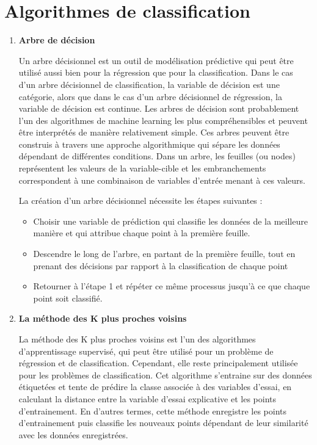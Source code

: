 \documentclass[12pt,a4paper,openay]{book}
\numberwithin{equation}{chapter}
\begin{document}
	\section{Algorithmes de classification}
	  \begin{enumerate}
	  
	  \item \textbf{Arbre de d\'ecision}
	  
	  Un arbre d\'ecisionnel est un outil de mod\'elisation pr\'edictive qui peut \^etre utilis\'e aussi bien pour la r\'egression que pour la classification. Dans le cas d'un arbre d\'ecisionnel de classification, la variable de d\'ecision est une cat\'egorie, alors que dans le cas d'un arbre d\'ecisionnel de r\'egression, la variable de d\'ecision est continue. Les arbres de d\'ecision sont probablement l'un des algorithmes de machine learning les plus compr\'ehensibles et peuvent \^etre interpr\'et\'es de mani\`ere relativement simple. Ces arbres peuvent \^etre construis \`a travers une approche algorithmique qui s\'epare les donn\'ees d\'ependant de diff\'erentes conditions. Dans un arbre, les feuilles (ou nodes) repr\'esentent les valeurs de la variable-cible et les embranchements correspondent \`a une combinaison de variables d'entr\'ee menant \`a ces valeurs.
	  
	  La cr\'eation d'un arbre d\'ecisionnel n\'ecessite les \'etapes suivantes :	  
	  \begin{itemize}
        \item Choisir une variable de pr\'ediction qui classifie les donn\'ees de la meilleure mani\`ere et qui attribue chaque point \`a la premi\`ere feuille.
	  	  
	  	  \item Descendre le long de l'arbre, en partant de la premi\`ere feuille, tout en prenant des d\'ecisions par rapport \`a la classification de chaque point
	  	  
	  	  \item Retourner \`a l'\'etape 1 et r\'ep\'eter ce m\^eme processus jusqu'\`a ce que chaque point soit classifi\'e.
	  \end{itemize}
	  \item \textbf{La m\'ethode des K plus proches voisins}
	  
	  La m\'ethode des K plus proches voisins est l'un des algorithmes d'apprentissage supervis\'e, qui peut \^etre utilis\'e pour un probl\`eme de r\'egression et de classification. Cependant, elle reste principalement utilis\'ee pour les probl\`emes de classification. Cet algorithme s'entraine sur des donn\'ees \'etiquet\'ees et tente de pr\'edire la classe associ\'ee \`a des variables d'essai, en calculant la distance entre la variable d'essai explicative et les points d'entrainement. En d'autres termes, cette m\'ethode enregistre les points d'entrainement puis classifie les nouveaux points d\'ependant de leur similarit\'e avec les donn\'ees enregistr\'ees.\\
	  

\end{enumerate}
\end{document}
